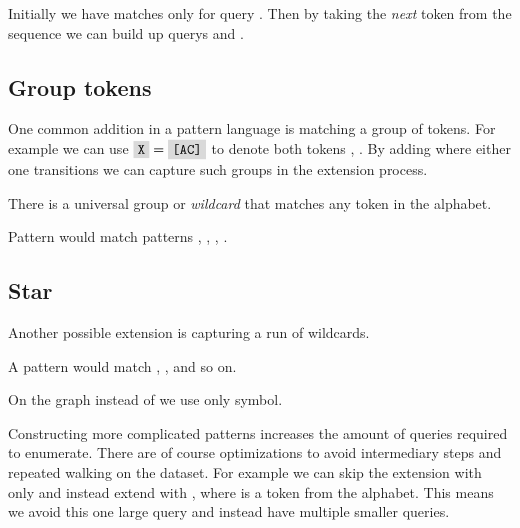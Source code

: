 Initially we have matches only for query . Then by taking the \emph{next} token from the sequence we can build up querys  and .

\subsection{Group tokens}

One common addition in a pattern language is matching a group of tokens. For example we can use $\R{X} = \R{[AC]}$ to denote both tokens , . By adding where either one transitions we can capture such groups in the extension process.

\begin{figure}[H]
	
\end{figure}

There is a universal group  or \emph{wildcard} that matches any token in the alphabet.

\begin{exmp}
Pattern  would match patterns , , , .
\end{exmp}

\subsection{Star}

Another possible extension is capturing a run of wildcards.

\begin{exmp}
A pattern  would match , ,  and so on.
\end{exmp}

On the graph instead of  we use only \R{*} symbol.

\begin{figure}[H]
	
\end{figure}

Constructing more complicated patterns increases the amount of queries required to enumerate. There are of course optimizations to avoid intermediary steps and repeated walking on the dataset. For example we can skip the extension with only  and instead extend with , where  is a token from the alphabet. This means we avoid this one large query and instead have multiple smaller queries.

\begin{figure}[H]
	
\end{figure}

